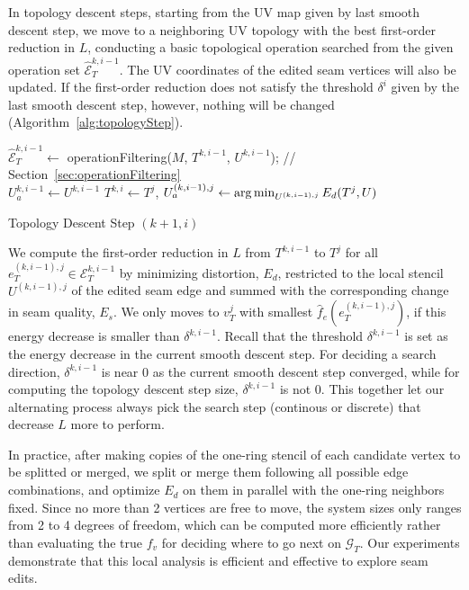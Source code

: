 In topology descent steps, starting from the UV map given by last smooth descent step, we move to a neighboring UV topology with the best first-order reduction in $L$, conducting a basic topological operation searched from the given operation set $\hat{\mathcal{E}}^{k,i-1}_T$. The UV coordinates of the edited seam vertices will also be updated. If the first-order reduction does not satisfy the threshold $\delta^i$ given by the last smooth descent step, however, nothing will be changed (Algorithm~\ref{alg:topologyStep}).

\begin{algorithm}[h]
\SetAlgoLined
{}
$\hat{\mathcal{E}}^{k,i-1}_T \leftarrow$ operationFiltering($M$, $T^{k,i-1}$, $U^{k,i-1}$); // Section~\ref{sec:operationFiltering}\\
$U_a^{k,i-1} \leftarrow U^{k,i-1}$\;
{
  $T^{k,i} \leftarrow T^j$, $U_a^{(k,i-1),j} \leftarrow \operatorname*{arg\,min}_{U^{(k,i-1),j}} E_d(T^j,U)$\;
}
\caption{Topology Descent Step $(k+1,i)$}
\label{alg:topologyStep}
\end{algorithm}
 
We compute the first-order reduction  in $L$ from $T^{k,i-1}$ to $T^j$ for all $e^{(k,i-1),j}_T \in \mathcal{E}^{k,i-1}_T$ by minimizing distortion, $E_d$, restricted to the local stencil $U^{(k,i-1),j}$ of the edited seam edge and summed with the corresponding change in seam quality, $E_s$. We only moves to  $v^j_T$ with smallest $\hat{f}_e(e^{(k,i-1),j}_{T})$, if this energy decrease is smaller than $\delta^{k,i-1}$. Recall that the threshold $\delta^{k,i-1}$ is set as the energy decrease in the current smooth descent step. For deciding a search direction, $\delta^{k,i-1}$ is near $0$ as the current smooth descent step converged, while for computing the topology descent step size, $\delta^{k,i-1}$ is not $0$. This together let our alternating process always pick the search step (continous or discrete) that decrease $L$ more to perform.

In practice, after making copies of the one-ring stencil of each candidate vertex to be splitted or merged, we split or merge them following all possible edge combinations, and optimize $E_d$ on them in parallel with the one-ring neighbors fixed. Since no more than 2 vertices are free to move, the system sizes only ranges from 2 to 4 degrees of freedom, which can be computed more efficiently rather than evaluating the true $f_v$ for deciding where to go next on $\mathcal{G}_T$. Our experiments demonstrate that this local analysis is efficient and effective to explore seam edits.

